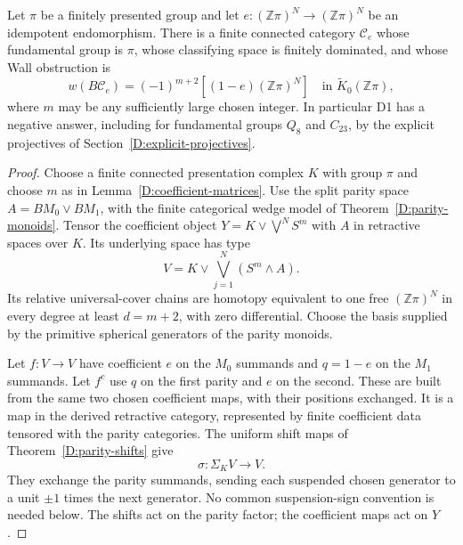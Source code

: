 \begin{theorem}
\label{D:Wall-realization}
Let $\pi$ be a finitely presented group and let
$e:(\mathbb Z\pi)^N\to(\mathbb Z\pi)^N$ be an idempotent
endomorphism.  There is a finite connected category $\mathcal C_e$
whose fundamental group is $\pi$, whose classifying space is
finitely dominated, and whose Wall obstruction is
\[
 w(B\mathcal C_e)=(-1)^{m+2}[(1-e)(\mathbb Z\pi)^N]
 \quad\text{in }\widetilde K_0(\mathbb Z\pi),
\]
where $m$ may be any sufficiently large chosen integer.
In particular D1 has a negative answer, including for fundamental
groups $Q_8$ and $C_{23}$, by the explicit projectives of
Section~\ref{D:explicit-projectives}.
\end{theorem}
\begin{proof}
Choose a finite connected presentation complex $K$ with group $\pi$
and choose $m$ as in Lemma~\ref{D:coefficient-matrices}.
Use the split parity space
$A=BM_0\vee BM_1$, with the finite categorical wedge model of
Theorem~\ref{D:parity-monoids}.  Tensor the coefficient object
$Y=K\vee\bigvee^N S^m$ with $A$ in retractive spaces over $K$.
Its underlying space has type
\[
 V=K\vee\bigvee_{j=1}^N(S^m\wedge A).
\]
Its relative universal-cover chains are homotopy equivalent to
one free $(\mathbb Z\pi)^N$ in every degree at least
$d=m+2$, with zero differential.  Choose the basis supplied by
the primitive spherical generators of the parity monoids.

Let $f:V\to V$ have coefficient $e$ on the $M_0$ summands and
$q=1-e$ on the $M_1$ summands.  Let $f^c$ use $q$ on the first
parity and $e$ on the second.  These are built from the same two
chosen coefficient maps, with their positions exchanged.  It is a map in the derived retractive
category, represented by finite coefficient data tensored with
the parity categories.  The uniform shift maps of
Theorem~\ref{D:parity-shifts} give
\[
 \sigma:\Sigma_K V\longrightarrow V.
\]
They exchange the parity summands, sending each suspended chosen
generator to a unit $\pm1$ times the next generator. No common
suspension-sign convention is needed below. The shifts act on the
parity factor; the coefficient maps act on $Y$.


\end{proof}
